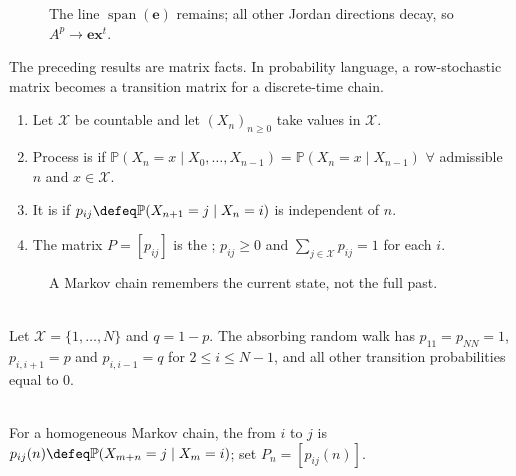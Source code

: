 \begin{figure}[H]
  \centering
  
  \caption{The line $\operatorname{span}(\mathbf{e})$ remains; all other Jordan directions decay, so $A^p\to\mathbf{e}\mathbf{x}^t$.}
  \label{fig:positive-markov-stationary-limit}
\end{figure}

The preceding results are matrix facts. In probability language, a row-stochastic matrix becomes a transition matrix for a discrete-time chain.

\begin{definition} \label{def:homogeneous-markov-chain-transition-matrix} 
\begin{enumerate}[label=(\roman*)]
\setlength{\itemsep}{0pt}
\item Let $\mathcal{X}$ be countable and let $(X_n)_{n\geq0}$ take values in $\mathcal{X}$.
\item Process is  if $\mathbb{P}(X_n=x\mid X_0,\ldots,X_{n-1})=\mathbb{P}(X_n=x\mid X_{n-1})$ $\forall$ admissible $n$ and $x\in\mathcal{X}$.
\item It is  if $p_{ij}\defeq\mathbb{P}(X_{n+1}=j\mid X_n=i)$ is independent of $n$.
\item The matrix $P=[p_{ij}]$ is the ; $p_{ij}\geq0$ and $\sum\limits_{j\in\mathcal{X}}p_{ij}=1$ for each $i$.
\end{enumerate}
\end{definition}

\begin{figure}[H]
  \centering
  
  \caption{A Markov chain remembers the current state, not the full past.}
  \label{fig:markov-chain-dag}
\end{figure}

\begin{example} \label{ex:random-walk-absorbing-barriers} \\
Let $\mathcal{X}=\{1,\ldots,N\}$ and $q=1-p$.
The absorbing random walk has $p_{11}=p_{NN}=1$, $p_{i,i+1}=p$ and $p_{i,i-1}=q$ for $2\leq i\leq N-1$, and all other transition probabilities equal to $0$.
\end{example}

\begin{definition} \label{def:n-step-transition-probabilities} \\
For a homogeneous Markov chain, the  from $i$ to $j$ is\\
$p_{ij}(n)\defeq\mathbb{P}(X_{m+n}=j\mid X_m=i)$; set $P_n=[p_{ij}(n)]$.
\end{definition}


